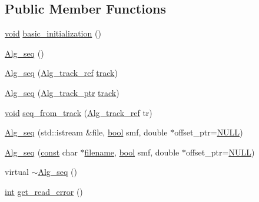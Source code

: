 \subsection*{Public Member Functions}
\begin{DoxyCompactItemize}
\item 
\hyperlink{sound_8c_ae35f5844602719cf66324f4de2a658b3}{void} \hyperlink{class_alg__seq_ab02616a7e561becbe1b1775d333ac74b}{basic\+\_\+initialization} ()
\item 
\hyperlink{class_alg__seq_a7567945bc928f137f0269b8ba2b80faf}{Alg\+\_\+seq} ()
\item 
\hyperlink{class_alg__seq_a76eb3802284e703afe0da0d860a3313d}{Alg\+\_\+seq} (\hyperlink{allegro_8h_a8230fff6376db7bf61d8b19220a4625f}{Alg\+\_\+track\+\_\+ref} \hyperlink{class_alg__seq_a438085fa1294b40c095ba92c16880dfa}{track})
\item 
\hyperlink{class_alg__seq_a86faa3d41e0f06aa8cdd78d360293b43}{Alg\+\_\+seq} (\hyperlink{allegro_8h_a4a72ca46459ff96c43e76567e345d0e0}{Alg\+\_\+track\+\_\+ptr} \hyperlink{class_alg__seq_a438085fa1294b40c095ba92c16880dfa}{track})
\item 
\hyperlink{sound_8c_ae35f5844602719cf66324f4de2a658b3}{void} \hyperlink{class_alg__seq_a114a7c65668d05dbe94f19ed07ebf300}{seq\+\_\+from\+\_\+track} (\hyperlink{allegro_8h_a8230fff6376db7bf61d8b19220a4625f}{Alg\+\_\+track\+\_\+ref} tr)
\item 
\hyperlink{class_alg__seq_a9edfade3cf2e5111fdaa96e28be0b003}{Alg\+\_\+seq} (std\+::istream \&file, \hyperlink{mac_2config_2i386_2lib-src_2libsoxr_2soxr-config_8h_abb452686968e48b67397da5f97445f5b}{bool} smf, double $\ast$offset\+\_\+ptr=\hyperlink{px__mixer_8h_a070d2ce7b6bb7e5c05602aa8c308d0c4}{N\+U\+LL})
\item 
\hyperlink{class_alg__seq_aa9cf90b5b25a14aff7309d03fa4543d9}{Alg\+\_\+seq} (\hyperlink{getopt1_8c_a2c212835823e3c54a8ab6d95c652660e}{const} char $\ast$\hyperlink{test__portburn_8cpp_a7efa5e9c7494c7d4586359300221aa5d}{filename}, \hyperlink{mac_2config_2i386_2lib-src_2libsoxr_2soxr-config_8h_abb452686968e48b67397da5f97445f5b}{bool} smf, double $\ast$offset\+\_\+ptr=\hyperlink{px__mixer_8h_a070d2ce7b6bb7e5c05602aa8c308d0c4}{N\+U\+LL})
\item 
virtual \hyperlink{class_alg__seq_a53427a639fa28c78966639fc4b821d63}{$\sim$\+Alg\+\_\+seq} ()
\item 
\hyperlink{xmltok_8h_a5a0d4a5641ce434f1d23533f2b2e6653}{int} \hyperlink{class_alg__seq_ae675d8637b6a4f5dde7cf5bd80fd65ae}{get\+\_\+read\+\_\+error} ()
\item 

\end{DoxyCompactItemize}

